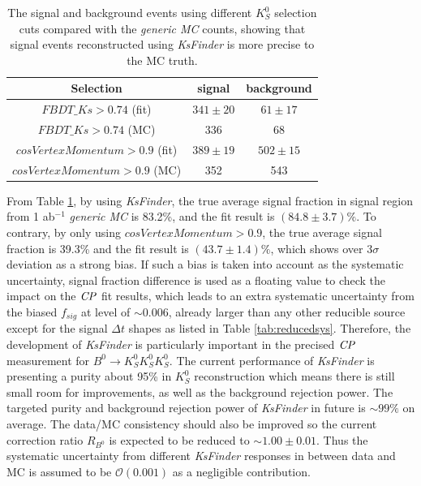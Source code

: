 \begin{table}[htpb]
	\centering
	\caption{The signal and background events using different $K_S^0$ selection cuts compared with the \textit{generic MC} counts, showing that signal events reconstructed using \textit{KsFinder} is more precise to the MC truth. }
	\label{tab:ksbias}
	\begin{tabular}{c| c |c}
		\hline
		Selection & signal  & background \\
		\hline
		${FBDT\_Ks>0.74}$ (fit) & $341\pm20$ & $61\pm17$ \\
		${FBDT\_Ks>0.74}$ (MC) & 336 & 68\\
		${cosVertexMomentum>0.9}$ (fit) & $389\pm19$ & $502\pm15$\\
		${cosVertexMomentum>0.9}$ (MC) & 352 & 543\\
		\hline
	\end{tabular}
\end{table}

From Table \ref{tab:ksbias}, by using \textit{KsFinder}, the true average signal fraction in signal region from 1 ab$^{-1}$ \textit{generic MC} is 83.2\%, and the fit result is $(84.8\pm3.7)\%$. To contrary, by only using ${cosVertexMomentum>0.9}$, the true average signal fraction is 39.3\% and the fit result is $(43.7\pm1.4)\%$, which shows over $3\sigma$ deviation as a strong bias. If such a bias is taken into account as the systematic uncertainty, signal fraction difference is used as a floating value to check the impact on the $\it{CP}$ fit results, which leads to an extra systematic uncertainty from the biased $f_{sig}$ at level of $\sim 0.006$, already larger than any other reducible source except for the signal $\Delta t$ shapes as listed in Table \ref{tab:reducedsys}. Therefore, the development of \textit{KsFinder} is particularly important in the precised $\it{CP}$ measurement for $B^0 \to K_S^0  K_S^0  K_S^0$. The current performance of \textit{KsFinder} is presenting a purity about 95\% in $K_S^0$ reconstruction which means there is still small room for improvements, as well as the background rejection power. The targeted purity and background rejection power of \textit{KsFinder} in future is $\sim 99\%$ on average. The data/MC consistency should also be improved so the current correction ratio $R_{B^0}$ is expected to be reduced to $\sim 1.00\pm 0.01$. Thus the systematic uncertainty from different \textit{KsFinder} responses in between data and MC is assumed to be $\mathcal{O}(0.001)$ as a negligible contribution. 



